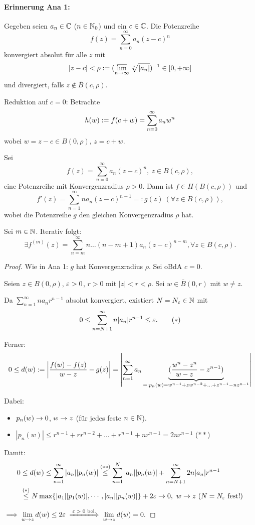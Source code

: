 \documentclass[a4paper,twoside,DIV15,BCOR12mm]{scrbook}
\newcommand{\ls}{\varlimsup}
\begin{document}
\paragraph{Erinnerung Ana 1:} Gegeben seien $a_n\in\mathbb{C}$ ($n\in\mathbb{N}_0$) und ein $c\in\mathbb{C}$. Die Potenzreihe
\[f(z) = \sum_{n=0}^\infty a_n(z-c)^n\]
konvergiert absolut für alle $z$ mit
\[|z-c| < \rho \da (\ls_{n\ra\infty}\sqrt[n]{|a_n|})^{-1}\in[0,+\infty]\] 
und divergiert, falls $z\notin \bar{B}(c,\rho)$.

Reduktion auf $c=0$: Betrachte
\[h(w) := f(c+w) = \sum_{n=0}^\infty a_n w^n\]
wobei $w=z-c\in B(0,\rho)$, $z=c+w$.

\begin{satz} Sei
\[f(z) = \sum_{n=0}^\infty a_n(z-c)^n,\ z\in B(c,\rho),\]
eine Potenzreihe mit Konvergenzradius $\rho > 0$. Dann ist $f\in H(B(c,\rho))$ und
\[f'(z) = \sum_{n=1}^\infty n a_n(z-c)^{n-1} =: g(z)\ (\forall z\in B(c,\rho)),\]
wobei die Potenzreihe $g$ den gleichen Konvergenzradius $\rho$ hat.

Sei $m\in\mathbb{N}$. Iterativ folgt:
\[\exists f^{(m)}(z) = \sum_{n=m}^\infty n\dotsc (n-m+1) a_n(z-c)^{n-m}, \forall z\in B(c,\rho).\]
\end{satz}
\begin{proof} Wie in Ana 1: $g$ hat Konvergenzradius $\rho$. Sei oBdA $c = 0$.

Seien $z\in B(0,\rho)$, $\varepsilon>0$, $r>0$ mit $|z|<r<\rho$. Sei $w\in \bar{B}(0,r)$ mit $w\neq z$.

Da $\sum_{n=1}^\infty na_nr^{n-1}$ absolut konvergiert, existiert $N = N_\varepsilon\in\mathbb{N}$ mit
\[0 \leq \sum_{n=N+1}^\infty n |a_n| r^{n-1} \leq \varepsilon.\tag{$\ast$}\]

Ferner:
\[0\leq d(w) := \left| \frac{f(w)-f(z)}{w-z} - g(z)\right| = \left| \sum_{n=1}^\infty a_n\underbrace{(\frac{w^n-z^n}{w-z} - z^{n-1})}_{=: p_n(w) = w^{n-1}+zw^{n-2}+\dotsc+z^{n-1}-nz^{n-1}}\right|\]

Dabei: %
\begin{itemize}
\item $p_n(w) \rightarrow 0$, $w\rightarrow z$ (für jedes feste $n\in\mathbb{N}$).
\item $|p_n(w)| \leq r^{n-1} + rr^{n-2} + \dotsc + r^{n-1} + nr^{n-1} = 2nr^{n-1}$ \hfill($\ast\ast$)
\end{itemize}

Damit:
\begin{eqnarray*}
0&\leq d(w) \leq \sum_{n=1}^\infty |a_n||p_n(w)| \stackrel{(\ast\ast)}{\leq} \sum_{n=1}^N |a_n||p_n(w)| + \sum_{n=N+1}^\infty 2n|a_n|r^{n-1}\\
&\stackrel{(\ast)}{\leq} N \max\{|a_1||p_1(w)|,\dotsb,|a_n||p_n(w)|\} + 2\varepsilon \rightarrow 0,\ w\rightarrow z\ (N = N_\varepsilon\ \text{fest!})
\end{eqnarray*}

$\displaystyle\folgt \lim_{w\ra z} d(w) \leq 2\ep \folgtnach{$\ep>0$ bel.} \lim_{w\ra z} d(w) = 0.$
\end{proof}
\end{document}
